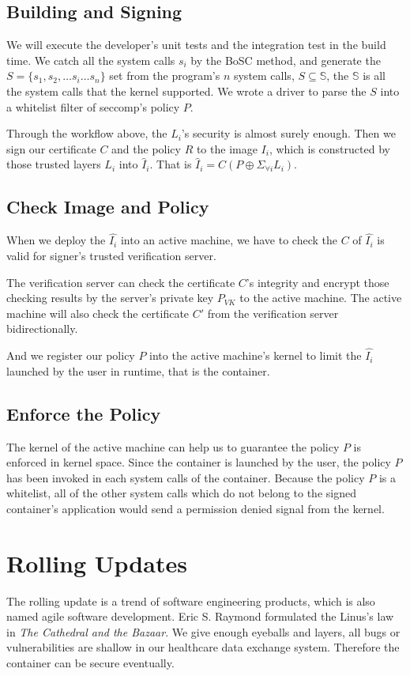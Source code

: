 \subsection{Building and Signing}

We will execute the developer's unit tests and the integration test in the build time.
We catch all the system calls $s_i$ by the BoSC\cite{1495942} method,
and generate the $S = \{s_1, s_2, \dots s_i \dots s_n\}$ set from the
program's $n$ system calls, $S \subseteq \mathbb{S}$, the $\mathbb{S}$ is all the system
calls that the kernel supported.  We wrote a driver to parse the $S$ into
a whitelist filter of seccomp's policy $P$.


Through the workflow above, the $L_i$'s security is almost surely enough.
Then we sign our certificate $C$ and the policy $R$ to the image $I_i$, which
is constructed by those trusted layers $L_i$ into $\hat I_{i}$. That is
$\hat I_{i} = C(P \oplus \Sigma_{\forall i} L_i)$.


\subsection{Check Image and Policy}
When we deploy the $\hat{I_i}$ into an active machine, we have to check the $C$ of
$\hat{I_i}$ is valid for signer's trusted verification server.

The verification server can check the certificate $C$'s integrity and encrypt those
checking results by the server's private key $P_{VK}$ to the active machine. The active
machine will also check the certificate $C'$ from the verification server bidirectionally.

And we register our policy $P$ into the active machine's kernel to limit the $\hat{I_i}$
launched by the user in runtime, that is the container.

\subsection{Enforce the Policy}

The kernel of the active machine can help us to guarantee the policy $P$ is enforced in
kernel space. Since the container is launched by the user, the policy $P$
has been invoked in each system calls of the container. Because the policy $P$ is a whitelist,
all of the other system calls which do not belong to the signed container's application
would send a permission denied signal from the kernel.

\section{Rolling Updates}

The rolling update is a trend of software engineering products, which is
also named agile software development. Eric S. Raymond formulated
the Linus's law in \emph{The Cathedral and the Bazaar}\cite{9780596001087}.
We give enough eyeballs and layers, all bugs or vulnerabilities are shallow in our
healthcare data exchange system. Therefore the container can be secure eventually.
